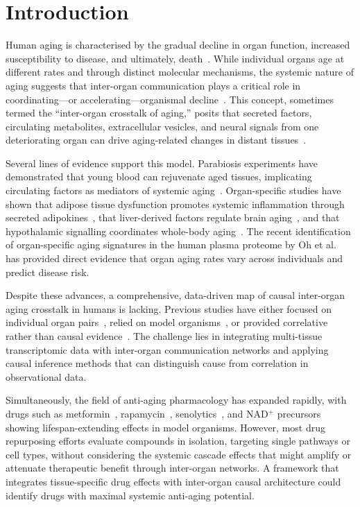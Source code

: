 \documentclass[11pt,a4paper]{article}
\begin{document}
\section*{Introduction}

Human aging is characterised by the gradual decline in organ function, increased susceptibility to disease, and ultimately, death~\cite{ref1,ref2}. While individual organs age at different rates and through distinct molecular mechanisms, the systemic nature of aging suggests that inter-organ communication plays a critical role in coordinating---or accelerating---organismal decline~\cite{ref3,ref4}. This concept, sometimes termed the ``inter-organ crosstalk of aging,'' posits that secreted factors, circulating metabolites, extracellular vesicles, and neural signals from one deteriorating organ can drive aging-related changes in distant tissues~\cite{ref5,ref6}.

Several lines of evidence support this model. Parabiosis experiments have demonstrated that young blood can rejuvenate aged tissues, implicating circulating factors as mediators of systemic aging~\cite{ref7,ref8}. Organ-specific studies have shown that adipose tissue dysfunction promotes systemic inflammation through secreted adipokines~\cite{ref9}, that liver-derived factors regulate brain aging~\cite{ref10}, and that hypothalamic signalling coordinates whole-body aging~\cite{ref11}. The recent identification of organ-specific aging signatures in the human plasma proteome by Oh et al.~\cite{ref12} has provided direct evidence that organ aging rates vary across individuals and predict disease risk.

Despite these advances, a comprehensive, data-driven map of causal inter-organ aging crosstalk in humans is lacking. Previous studies have either focused on individual organ pairs~\cite{ref13}, relied on model organisms~\cite{ref14}, or provided correlative rather than causal evidence~\cite{ref15}. The challenge lies in integrating multi-tissue transcriptomic data with inter-organ communication networks and applying causal inference methods that can distinguish cause from correlation in observational data.

Simultaneously, the field of anti-aging pharmacology has expanded rapidly, with drugs such as metformin~\cite{ref16}, rapamycin~\cite{ref17}, senolytics~\cite{ref18}, and NAD$^+$ precursors~\cite{ref19} showing lifespan-extending effects in model organisms. However, most drug repurposing efforts evaluate compounds in isolation, targeting single pathways or cell types, without considering the systemic cascade effects that might amplify or attenuate therapeutic benefit through inter-organ networks. A framework that integrates tissue-specific drug effects with inter-organ causal architecture could identify drugs with maximal systemic anti-aging potential.
\end{document}
